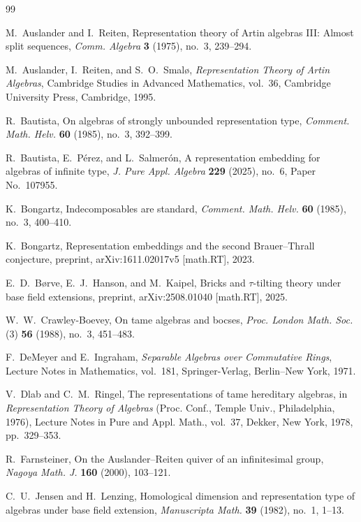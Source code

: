 \documentclass[11pt,letterpaper,reqno]{amsart}
\theoremstyle{definition}
\begin{document}
\begin{thebibliography}{99}

M.~Auslander and I.~Reiten,
Representation theory of Artin algebras III: Almost split sequences,
\emph{Comm. Algebra} \textbf{3} (1975), no.~3, 239--294.

M.~Auslander, I.~Reiten, and S.~O.~Smal{\o},
\emph{Representation Theory of Artin Algebras},
Cambridge Studies in Advanced Mathematics, vol.~36,
Cambridge University Press, Cambridge, 1995.

R.~Bautista,
On algebras of strongly unbounded representation type,
\emph{Comment. Math. Helv.} \textbf{60} (1985), no.~3, 392--399.

R.~Bautista, E.~P\'erez, and L.~Salmer\'on,
A representation embedding for algebras of infinite type,
\emph{J. Pure Appl. Algebra} \textbf{229} (2025), no.~6,
Paper No.~107955.

K.~Bongartz,
Indecomposables are standard,
\emph{Comment. Math. Helv.} \textbf{60} (1985), no.~3, 400--410.

K.~Bongartz,
Representation embeddings and the second Brauer--Thrall conjecture,
preprint, arXiv:1611.02017v5 [math.RT], 2023.

E.~D.~B{\o}rve, E.~J.~Hanson, and M.~Kaipel,
Bricks and  $\tau$-tilting theory under base field extensions,
preprint, arXiv:2508.01040 [math.RT], 2025.

W.~W.~Crawley-Boevey,
On tame algebras and bocses,
\emph{Proc. London Math. Soc.} (3) \textbf{56} (1988), no.~3, 451--483.

F.~DeMeyer and E.~Ingraham,
\emph{Separable Algebras over Commutative Rings},
Lecture Notes in Mathematics, vol.~181,
Springer-Verlag, Berlin--New York, 1971.

V.~Dlab and C.~M.~Ringel,
The representations of tame hereditary algebras,
in \emph{Representation Theory of Algebras} (Proc. Conf., Temple Univ.,
Philadelphia, 1976), Lecture Notes in Pure and Appl. Math., vol.~37,
Dekker, New York, 1978, pp.~329--353.

R.~Farnsteiner,
On the Auslander--Reiten quiver of an infinitesimal group,
\emph{Nagoya Math. J.} \textbf{160} (2000), 103--121.


C.~U.~Jensen and H.~Lenzing,
Homological dimension and representation type of algebras under base field
extension,
\emph{Manuscripta Math.} \textbf{39} (1982), no.~1, 1--13.


\end{thebibliography}
\end{document}
